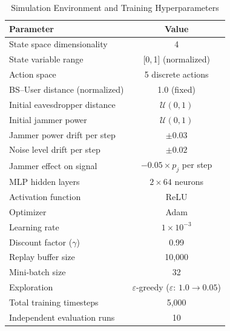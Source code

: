 \documentclass[conference]{IEEEtran}
\begin{document}
\begin{table}[htbp]
\caption{Simulation Environment and Training Hyperparameters}
\centering
\begin{tabular}{|l|c|}
\hline
\textbf{Parameter} & \textbf{Value} \\
\hline
State space dimensionality & 4 \\
State variable range & {[}0,\,1{]} (normalized) \\
Action space & 5 discrete actions \\
BS--User distance (normalized) & 1.0 (fixed) \\
Initial eavesdropper distance & $\mathcal{U}(0,1)$ \\
Initial jammer power & $\mathcal{U}(0,1)$ \\
Jammer power drift per step & $\pm 0.03$ \\
Noise level drift per step & $\pm 0.02$ \\
Jammer effect on signal & $-0.05 \times p_j$ per step \\
MLP hidden layers & $2 \times 64$ neurons \\
Activation function & ReLU \\
Optimizer & Adam \\
Learning rate & $1\times10^{-3}$ \\
Discount factor ($\gamma$) & 0.99 \\
Replay buffer size & 10,000 \\
Mini-batch size & 32 \\
Exploration & $\varepsilon$-greedy ($\varepsilon$: $1.0\!\to\!0.05$) \\
Total training timesteps & 5,000 \\
Independent evaluation runs & 10 \\
\hline
\end{tabular}
\label{tab:sim_params}
\end{table}
\end{document}
